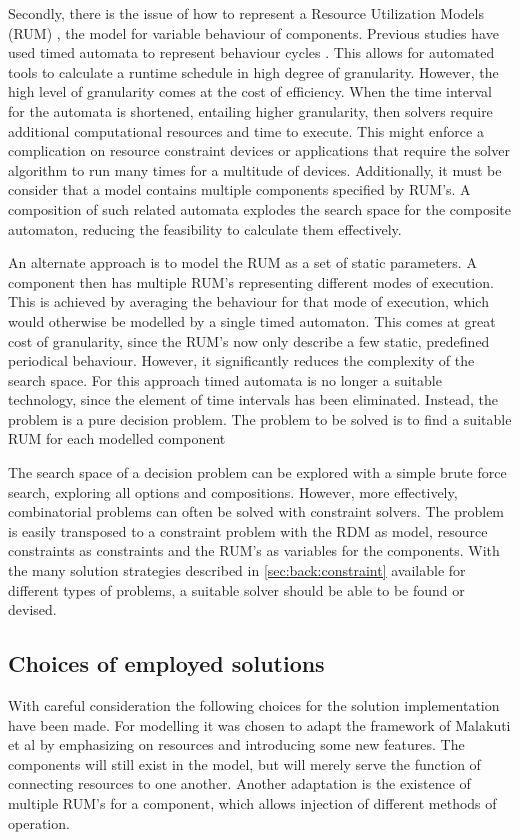 Secondly, there is the issue of how to represent a Resource Utilization Models (RUM) \cite{steven_te_brinke}, the model for variable behaviour of components. Previous studies have used timed automata to represent behaviour cycles \cite{rum_basis_89, steven_te_brinke}. This allows for automated tools to calculate a runtime schedule in high degree of granularity. However, the high level of granularity comes at the cost of efficiency. When the time interval for the automata is shortened, entailing higher granularity, then solvers require additional computational resources and time to execute. This might enforce a complication on resource constraint devices or applications that require the solver algorithm to run many times for a multitude of devices. Additionally, it must be consider that a model contains multiple components specified by RUM's. A composition of such related automata explodes the search space for the composite automaton, reducing the feasibility to calculate them effectively.

An alternate approach is to model the RUM as a set of static parameters. A component then has multiple RUM's representing different modes of execution. This is achieved by averaging the behaviour for that mode of execution, which would otherwise be modelled by a single timed automaton. This comes at great cost of granularity, since the RUM's now only describe a few static, predefined periodical behaviour. However, it significantly reduces the complexity of the search space. For this approach timed automata is no longer a suitable technology, since the element of time intervals has been eliminated. Instead, the problem is a pure decision problem. The problem to be solved is to find a suitable RUM for each modelled component

The search space of a decision problem can be explored with a simple brute force search, exploring all options and compositions. However, more effectively, combinatorial problems can often be solved with constraint solvers. The problem is easily transposed to a constraint problem with the RDM as model, resource constraints as constraints and the RUM's as variables for the components. With the many solution strategies described in \ref{sec:back:constraint} available for different types of problems, a suitable solver should be able to be found or devised.

\subsection{Choices of employed solutions}
\label{sub:choices}
With careful consideration the following choices for the solution implementation have been made. For modelling it was chosen to adapt the framework of Malakuti et al \cite{steven_te_brinke} by emphasizing on resources and introducing some new features. The components will still exist in the model, but will merely serve the function of connecting resources to one another. Another adaptation is the existence of multiple RUM's for a component, which allows injection of different methods of operation.


